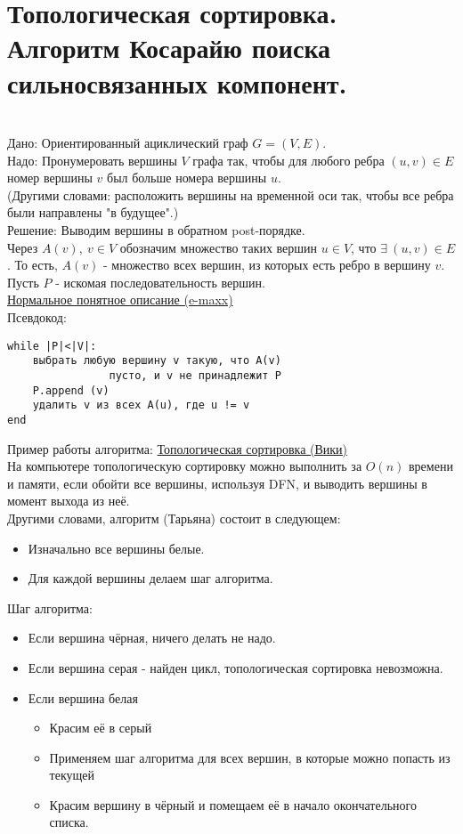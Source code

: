 \section{Топологическая сортировка. Алгоритм Косарайю поиска сильносвязанных компонент.}
\\
Дано: Ориентированный ациклический граф $G = (V, E)$.\\
Надо: Пронумеровать вершины $V$ графа так, чтобы для любого ребра $(u, v) \in E$ номер вершины $v$ был больше номера вершины $u$.\\
(Другими словами: расположить вершины на временной оси так, чтобы все ребра были направлены "в будущее".)\\
Решение: Выводим вершины в обратном post-порядке.\\
Через $A(v),\ v\in V$ обозначим множество таких вершин $u\in V$, что $\exists\  (u,v)\in E$.
То есть, $A(v)$ - множество всех вершин, из которых есть ребро в вершину $v$. Пусть $P$ -
искомая последовательность вершин.\\
\href{https://e-maxx.ru/algo/topological_sort}{Нормальное понятное описание (e-maxx)}\\
Псевдокод:
\begin{verbatim}
while |P|<|V|:
    выбрать любую вершину v такую, что A(v) 
                пусто, и v не принадлежит P
    P.append (v)
    удалить v из всех A(u), где u != v
end
\end{verbatim}
Пример работы алгоритма: \href {https://ru.wikipedia.org/wiki/Топологическая_сортировка}{Топологическая сортировка (Вики)}\\

На компьютере топологическую сортировку можно выполнить за $O(n)$ времени и памяти,
если обойти все вершины, используя DFN, и выводить вершины в момент выхода из неё.\\
Другими словами, алгоритм (Тарьяна) состоит в следующем:
\begin{itemize}
\item Изначально все вершины белые.
\item Для каждой вершины делаем шаг алгоритма.
\end{itemize}
Шаг алгоритма:
\begin{itemize}
\item Если вершина чёрная, ничего делать не надо.
\item Если вершина серая - найден цикл, топологическая сортировка невозможна.
\item Если вершина белая
\begin{itemize}
\item Красим её в серый
\item Применяем шаг алгоритма для всех вершин, в которые можно попасть из текущей
\item Красим вершину в чёрный и помещаем её в начало окончательного списка.
\end{itemize}
\end{itemize}

